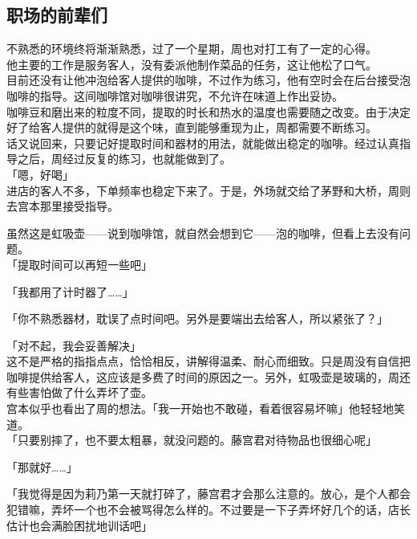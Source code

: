 \subsection{职场的前辈们}

不熟悉的环境终将渐渐熟悉，过了一个星期，周也对打工有了一定的心得。\\

他主要的工作是服务客人，没有委派他制作菜品的任务，这让他松了口气。\\

目前还没有让他冲泡给客人提供的咖啡，不过作为练习，他有空时会在后台接受泡咖啡的指导。这间咖啡馆对咖啡很讲究，不允许在味道上作出妥协。\\

咖啡豆和磨出来的粒度不同，提取的时长和热水的温度也需要随之改变。由于决定好了给客人提供的就得是这个味，直到能够重现为止，周都需要不断练习。\\

话又说回来，只要记好提取时间和器材的用法，就能做出稳定的咖啡。经过认真指导之后，周经过反复的练习，也就能做到了。\\

「嗯，好喝」\\

进店的客人不多，下单频率也稳定下来了。于是，外场就交给了茅野和大桥，周则去宫本那里接受指导。

虽然这是虹吸壶——说到咖啡馆，就自然会想到它——泡的咖啡，但看上去没有问题。\\

「提取时间可以再短一些吧」

「我都用了计时器了……」

「你不熟悉器材，耽误了点时间吧。另外是要端出去给客人，所以紧张了？」

「对不起，我会妥善解决」\\

这不是严格的指指点点，恰恰相反，讲解得温柔、耐心而细致。只是周没有自信把咖啡提供给客人，这应该是多费了时间的原因之一。另外，虹吸壶是玻璃的，周还有些害怕做了什么弄坏了壶。\\

宫本似乎也看出了周的想法。「我一开始也不敢碰，看着很容易坏嘛」他轻轻地笑道。\\

「只要别摔了，也不要太粗暴，就没问题的。藤宫君对待物品也很细心呢」

「那就好……」

「我觉得是因为莉乃第一天就打碎了，藤宫君才会那么注意的。放心，是个人都会犯错嘛，弄坏一个也不会被骂得怎么样的。不过要是一下子弄坏好几个的话，店长估计也会满脸困扰地训话吧」

